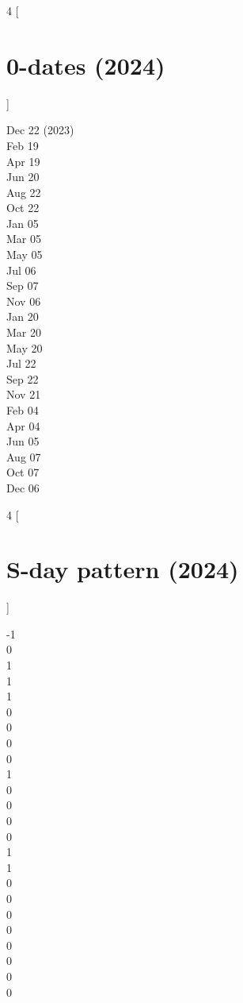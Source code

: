\documentclass[12 pt]{article}%
\begin{document}
\newpage

\begin{multicols}{4}
  [ \section{0-dates (2024)} ]
  \begin{center}
    Dec 22 (2023) \\ Feb 19 \\ Apr 19 \\ Jun 20 \\ Aug 22 \\ Oct 22 \\
    Jan 05 \\ Mar 05 \\ May 05 \\ Jul 06 \\ Sep 07 \\ Nov 06 \\
    Jan 20 \\ Mar 20 \\ May 20 \\ Jul 22 \\ Sep 22 \\ Nov 21 \\
    Feb 04 \\ Apr 04 \\ Jun 05 \\ Aug 07 \\ Oct 07 \\ Dec 06 \\
  \end{center}
\end{multicols}

\begin{multicols}{4}
  [ \section{S-day pattern (2024)} ]
  \begin{center}
    -1 \\ 0 \\ 1 \\ 1 \\ 1 \\ 0 \\
     0 \\ 0 \\ 0 \\ 1 \\ 0 \\ 0 \\
     0 \\ 0 \\ 1 \\ 1 \\ 0 \\ 0 \\
     0 \\ 0 \\ 0 \\ 0 \\ 0 \\ 0 \\
  \end{center}
\end{multicols}
\end{document}
